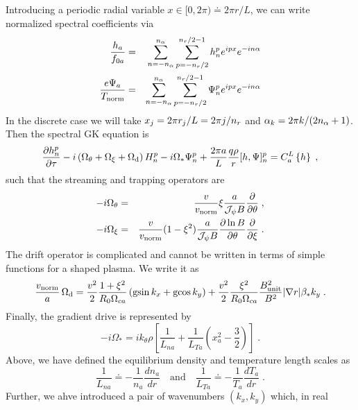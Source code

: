\documentclass[11pt]{article}
\begin{document}
Introducing a periodic radial variable $x \in [0,2\pi) \doteq 2 \pi r/L$, we can 
write normalized spectral coefficients via
%
\begin{eqnarray}
\frac{h_a}{f_{0a}} & = & \sum_{n=-n_\alpha}^{n_\alpha} 
                    \sum_{p=-n_r/2}^{n_r/2-1} h_n^p e^{ipx} e^{-in\alpha} \\
\frac{e \Psi_a}{T_{\rm norm}} & = &  \sum_{n=-n_\alpha}^{n_\alpha} 
                    \sum_{p=-n_r/2}^{n_r/2-1} \Psi_n^p e^{ipx} e^{-in\alpha} 
\end{eqnarray}
%
In the discrete case we will take $x_j = 2\pi r_j/L = 2\pi j/n_r$ 
and $\alpha_k = 2 \pi k/(2 n_\alpha+1)$.  Then the spectral GK equation is
%
\begin{equation}
\frac{\partial h_n^p}{\partial \tau}
- i \left( \Omega_{\theta} + \Omega_{\rm \xi} + \Omega_{\rm d} \right) H_n^p
  - i \Omega_* \Psi_n^p + \frac{2\pi a}{L} \frac{q \rho}{r}
   [h,\Psi]_n^p = C_a^{L}\left\{h\right\} \; ,
\label{ngkeqn}
\end{equation}
%
such that the streaming and trapping operators are
%
\begin{eqnarray}
-i \Omega_{\theta} &=& \frac{v}{v_{\rm norm}} \xi \frac{a}{{\cal J}_\psi B}  
\frac{\partial}{\partial \theta} \; , \\
-i \Omega_{\xi} &=& \frac{v}{v_{\rm norm}} (1-\xi^2)
\frac{a}{{\cal J}_\psi B} \frac{\partial \ln B}{\partial \theta}
  \frac{\partial}{\partial \xi} \; .
\end{eqnarray}
%
The drift operator is complicated and cannot be written in terms of simple 
functions for a shaped plasma.  We write it as
%
\begin{equation}
\frac{v_{\rm norm}}{a} \, \Omega_{\rm d} =  
 \frac{v^2}{2} \frac{1 + \xi^2}{R_0 \Omega_{ca}} \left( 
  {\rm gsin} \, k_x + {\rm gcos} \, k_y \right) 
 + \frac{v^2}{2} \frac{\xi^2}{R_0 \Omega_{ca}} 
\frac{B_{\rm unit}^2}{B^2} |\nabla r| \beta_* k_y \; .
\end{equation}
%
Finally, the gradient drive is represented by
\begin{equation}
- i \Omega_{*} = i k_{\theta} \rho \left[ \frac{1}{L_{na}} + \frac{1}{L_{Ta}}
\left( x_a^2 - \frac{3}{2} \right) \right] \; .
\end{equation}
%
Above, we have defined the equilibrium density and temperature length 
scales as
% 
\begin{equation}
\frac{1}{L_{na}}\doteq -\frac{1}{n_a}\frac{d n_a}{dr} 
\quad\mathrm{and}\quad
\frac{1}{L_{Ta}} \doteq -\frac{1}{T_a}\frac{d T_a}{dr} \; .
\end{equation} 
%
Further, we ahve introduced a pair of wavenumbers $(k_x,k_y)$  which, in real 
\end{document}
